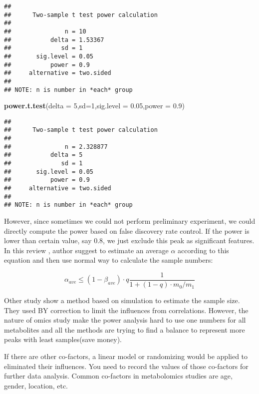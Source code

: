 \documentclass[
]{book}
\newenvironment{Shaded}{\begin{snugshade}}{\end{snugshade}}
\newcommand{\DataTypeTok}[1]{\textcolor[rgb]{0.13,0.29,0.53}{#1}}
\newcommand{\DecValTok}[1]{\textcolor[rgb]{0.00,0.00,0.81}{#1}}
\newcommand{\FloatTok}[1]{\textcolor[rgb]{0.00,0.00,0.81}{#1}}
\newcommand{\KeywordTok}[1]{\textcolor[rgb]{0.13,0.29,0.53}{\textbf{#1}}}
\newcommand{\NormalTok}[1]{#1}
\begin{document}
\begin{verbatim}
## 
##      Two-sample t test power calculation 
## 
##               n = 10
##           delta = 1.53367
##              sd = 1
##       sig.level = 0.05
##           power = 0.9
##     alternative = two.sided
## 
## NOTE: n is number in *each* group
\end{verbatim}

\begin{Shaded}
\begin{Highlighting}[]
\KeywordTok{power.t.test}\NormalTok{(}\DataTypeTok{delta =} \DecValTok{5}\NormalTok{,}\DataTypeTok{sd=}\DecValTok{1}\NormalTok{,}\DataTypeTok{sig.level =} \FloatTok{0.05}\NormalTok{,}\DataTypeTok{power =} \FloatTok{0.9}\NormalTok{)}
\end{Highlighting}
\end{Shaded}

\begin{verbatim}
## 
##      Two-sample t test power calculation 
## 
##               n = 2.328877
##           delta = 5
##              sd = 1
##       sig.level = 0.05
##           power = 0.9
##     alternative = two.sided
## 
## NOTE: n is number in *each* group
\end{verbatim}

However, since sometimes we could not perform preliminary experiment, we could directly compute the power based on false discovery rate control. If the power is lower than certain value, say 0.8, we just exclude this peak as significant features. In this review \citep{oberg2009}, author suggest to estimate an average \(\alpha\) according to this equation \citep{benjamini1995} and then use normal way to calculate the sample numbers:

\[
\alpha_{ave} \leq (1-\beta_{ave})\cdot q\frac{1}{1+(1-q)\cdot m_0/m_1}
\]

Other study \citep{blaise2016a} show a method based on simulation to estimate the sample size. They used BY correction to limit the influences from correlations. However, the nature of omics study make the power analysis hard to use one numbers for all metabolites and all the methods are trying to find a balance to represent more peaks with least samples(save money).

If there are other co-factors, a linear model or randomizing would be applied to eliminated their influences. You need to record the values of those co-factors for further data analysis. Common co-factors in metabolomics studies are age, gender, location, etc.
\end{document}
